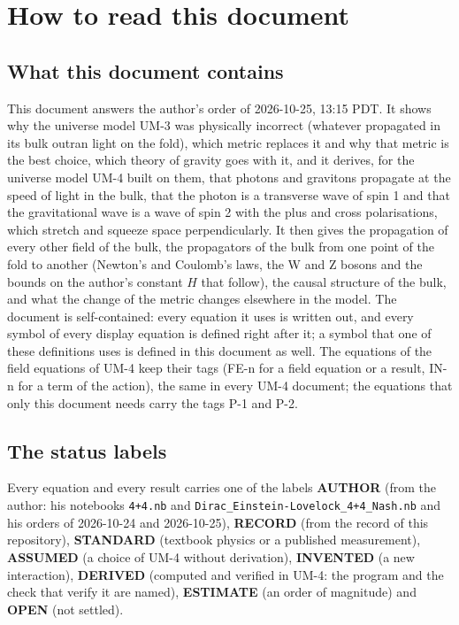 \documentclass[
  10pt,
]{article}
\begin{document}
\hypertarget{how-to-read-this-document}{%
\section{How to read this document}\label{how-to-read-this-document}}

\hypertarget{what-this-document-contains}{%
\subsection{What this document
contains}\label{what-this-document-contains}}

This document answers the author's order of 2026-10-25, 13:15 PDT. It
shows why the universe model UM-3 was physically incorrect (whatever
propagated in its bulk outran light on the fold), which metric replaces
it and why that metric is the best choice, which theory of gravity goes
with it, and it derives, for the universe model UM-4 built on them, that
photons and gravitons propagate at the speed of light in the bulk, that
the photon is a transverse wave of spin 1 and that the gravitational
wave is a wave of spin 2 with the plus and cross polarisations, which
stretch and squeeze space perpendicularly. It then gives the propagation
of every other field of the bulk, the propagators of the bulk from one
point of the fold to another (Newton's and Coulomb's laws, the W and Z
bosons and the bounds on the author's constant \(H\) that follow), the
causal structure of the bulk, and what the change of the metric changes
elsewhere in the model. The document is self-contained: every equation
it uses is written out, and every symbol of every display equation is
defined right after it; a symbol that one of these definitions uses is
defined in this document as well. The equations of the field equations
of UM-4 keep their tags (FE-n for a field equation or a result, IN-n for
a term of the action), the same in every UM-4 document; the equations
that only this document needs carry the tags P-1 and P-2.

\hypertarget{the-status-labels}{%
\subsection{The status labels}\label{the-status-labels}}

Every equation and every result carries one of the labels
\textbf{AUTHOR} (from the author: his notebooks \texttt{4+4.nb} and
\texttt{Dirac\_Einstein-Lovelock\_4+4\_Nash.nb} and his orders of
2026-10-24 and 2026-10-25), \textbf{RECORD} (from the record of this
repository), \textbf{STANDARD} (textbook physics or a published
measurement), \textbf{ASSUMED} (a choice of UM-4 without derivation),
\textbf{INVENTED} (a new interaction), \textbf{DERIVED} (computed and
verified in UM-4: the program and the check that verify it are named),
\textbf{ESTIMATE} (an order of magnitude) and \textbf{OPEN} (not
settled).
\end{document}
